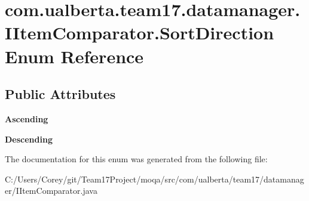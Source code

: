 \hypertarget{enumcom_1_1ualberta_1_1team17_1_1datamanager_1_1_i_item_comparator_1_1_sort_direction}{\section{com.\+ualberta.\+team17.\+datamanager.\+I\+Item\+Comparator.\+Sort\+Direction Enum Reference}
\label{enumcom_1_1ualberta_1_1team17_1_1datamanager_1_1_i_item_comparator_1_1_sort_direction}
}
\subsection*{Public Attributes}
\begin{DoxyCompactItemize}
\item 
\hypertarget{enumcom_1_1ualberta_1_1team17_1_1datamanager_1_1_i_item_comparator_1_1_sort_direction_aa3a88235c83f2713499da957d675dfe1}{{\bfseries Ascending}}\label{enumcom_1_1ualberta_1_1team17_1_1datamanager_1_1_i_item_comparator_1_1_sort_direction_aa3a88235c83f2713499da957d675dfe1}

\item 
\hypertarget{enumcom_1_1ualberta_1_1team17_1_1datamanager_1_1_i_item_comparator_1_1_sort_direction_a6f8d5759d3e4becdf893999066c004df}{{\bfseries Descending}}\label{enumcom_1_1ualberta_1_1team17_1_1datamanager_1_1_i_item_comparator_1_1_sort_direction_a6f8d5759d3e4becdf893999066c004df}

\end{DoxyCompactItemize}


The documentation for this enum was generated from the following file\+:\begin{DoxyCompactItemize}
\item 
C\+:/\+Users/\+Corey/git/\+Team17\+Project/moqa/src/com/ualberta/team17/datamanager/I\+Item\+Comparator.\+java\end{DoxyCompactItemize}
